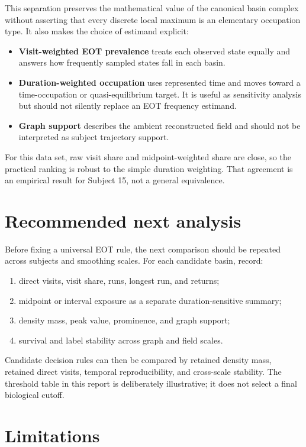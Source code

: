 \documentclass[11pt]{article}
\begin{document}
This separation preserves the mathematical value of the canonical basin
complex without asserting that every discrete local maximum is an elementary
occupation type.  It also makes the choice of estimand explicit:
\begin{itemize}
  \item \textbf{Visit-weighted EOT prevalence} treats each observed state
        equally and answers how frequently sampled states fall in each basin.
  \item \textbf{Duration-weighted occupation} uses represented time and moves
        toward a time-occupation or quasi-equilibrium target.  It is useful as
        sensitivity analysis but should not silently replace an EOT frequency
        estimand.
  \item \textbf{Graph support} describes the ambient reconstructed field and
        should not be interpreted as subject trajectory support.
\end{itemize}

For this data set, raw visit share and midpoint-weighted share are close, so
the practical ranking is robust to the simple duration weighting.  That
agreement is an empirical result for Subject 15, not a general equivalence.

\section{Recommended next analysis}

Before fixing a universal EOT rule, the next comparison should be repeated
across subjects and smoothing scales.  For each candidate basin, record:
\begin{enumerate}
  \item direct visits, visit share, runs, longest run, and returns;
  \item midpoint or interval exposure as a separate duration-sensitive
        summary;
  \item density mass, peak value, prominence, and graph support;
  \item survival and label stability across graph and field scales.
\end{enumerate}
Candidate decision rules can then be compared by retained density mass,
retained direct visits, temporal reproducibility, and cross-scale stability.
The threshold table in this report is deliberately illustrative; it does not
select a final biological cutoff.

\section{Limitations}
\end{document}
